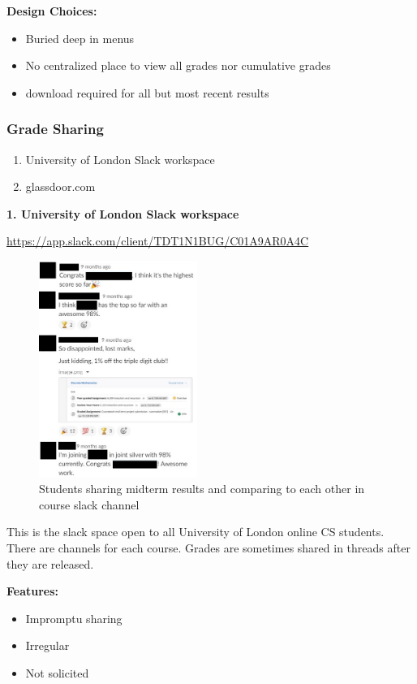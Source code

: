 \documentclass{article}
\begin{document}
\noindent \textbf{Design Choices:}
\begin{itemize}
\item Buried deep in menus
\item No centralized place to view all grades nor cumulative grades
\item download required for all but most recent results
\end{itemize}
\medskip

\subsubsection{Grade Sharing}
\begin{enumerate}
  \item University of London Slack workspace
  \item glassdoor.com
\end{enumerate}
\textbf{1. University of London Slack workspace}

\noindent \sloppy \url{https://app.slack.com/client/TDT1N1BUG/C01A9AR0A4C}
\bigskip

\begin{figure}[h]
\noindent \includegraphics[height=200pt]{slack-share}
\centering
\caption{Students sharing midterm results and comparing to each other in course slack channel}
\label{fig: slack-share}
\end{figure}

\noindent This is the slack space open to all University of London online CS students. There are channels for each course. Grades are sometimes shared in threads after they are released.
\bigskip

\noindent \textbf{Features:}
\begin{itemize}
\item Impromptu sharing
\item Irregular
\item Not solicited
\end{itemize}
\medskip
\end{document}
